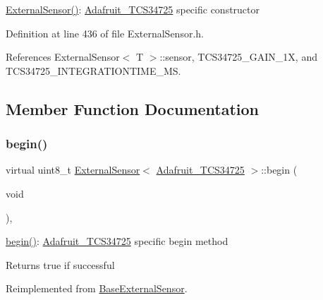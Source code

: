 \hyperlink{class_external_sensor_3_01_adafruit___t_c_s34725_01_4_a3b1855d165d295332b53e074344e3281}{External\+Sensor()}\+: \hyperlink{class_adafruit___t_c_s34725}{Adafruit\+\_\+\+T\+C\+S34725} specific constructor 

Definition at line 436 of file External\+Sensor.\+h.



References External\+Sensor$<$ T $>$\+::sensor, T\+C\+S34725\+\_\+\+G\+A\+I\+N\+\_\+1X, and T\+C\+S34725\+\_\+\+I\+N\+T\+E\+G\+R\+A\+T\+I\+O\+N\+T\+I\+M\+E\+\_\+MS.



\subsection{Member Function Documentation}
\mbox{\label{class_external_sensor_3_01_adafruit___t_c_s34725_01_4_ad9c1d1ac1f34ce1c153a0563d9cc55df}} 
\subsubsection{\texorpdfstring{begin()}{begin()}}
{\footnotesize\ttfamily virtual uint8\+\_\+t \hyperlink{class_external_sensor}{External\+Sensor}$<$ \hyperlink{class_adafruit___t_c_s34725}{Adafruit\+\_\+\+T\+C\+S34725} $>$\+::begin (\begin{DoxyParamCaption}\item[{void}]{ }\end{DoxyParamCaption})\hspace{0.3cm}{\ttfamily [inline]}, {\ttfamily [virtual]}}

\hyperlink{class_external_sensor_3_01_adafruit___t_c_s34725_01_4_ad9c1d1ac1f34ce1c153a0563d9cc55df}{begin()}\+: \hyperlink{class_adafruit___t_c_s34725}{Adafruit\+\_\+\+T\+C\+S34725} specific begin method

\begin{DoxyReturn}{Returns}
true if successful 
\end{DoxyReturn}


Reimplemented from \hyperlink{class_base_external_sensor_a87d132803d4f4fdd4e66332809f0c9a0}{Base\+External\+Sensor}.



